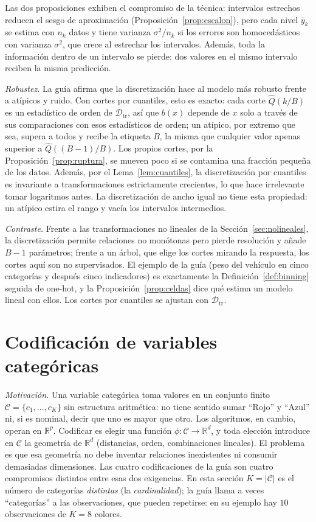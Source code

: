 \documentclass[11pt]{article}
\theoremstyle{definition}
\theoremstyle{remark}
\newcommand{\R}{\mathbb{R}}
\newcommand{\abs}[1]{\left\lvert #1\right\rvert}
\newcommand{\Dtr}{\mathcal{D}_{\mathrm{tr}}}
\begin{document}
\noindent Las dos proposiciones exhiben el compromiso de la técnica: intervalos estrechos reducen el sesgo de aproximación (Proposición~\ref{prop:escalon}), pero cada nivel $\bar y_k$ se estima con $n_k$ datos y tiene varianza $\sigma^2/n_k$ si los errores son homocedásticos con varianza $\sigma^2$, que crece al estrechar los intervalos. Además, toda la información dentro de un intervalo se pierde: dos valores en el mismo intervalo reciben la misma predicción.

\medskip

\noindent \emph{Robustez.} La guía afirma que la discretización hace al modelo más robusto frente a atípicos y ruido. Con cortes por cuantiles, esto es exacto: cada corte $\hat Q(k/B)$ es un estadístico de orden de $\Dtr$, así que $b(x)$ depende de $x$ solo a través de sus comparaciones con esos estadísticos de orden; un atípico, por extremo que sea, supera a todos y recibe la etiqueta $B$, la misma que cualquier valor apenas superior a $\hat Q((B-1)/B)$. Los propios cortes, por la Proposición~\ref{prop:ruptura}, se mueven poco si se contamina una fracción pequeña de los datos. Además, por el Lema~\ref{lem:cuantiles}, la discretización por cuantiles es invariante a transformaciones estrictamente crecientes, lo que hace irrelevante tomar logaritmos antes. La discretización de ancho igual no tiene esta propiedad: un atípico estira el rango y vacía los intervalos intermedios.

\medskip

\noindent \emph{Contraste.} Frente a las transformaciones no lineales de la Sección~\ref{sec:nolineales}, la discretización permite relaciones no monótonas pero pierde resolución y añade $B-1$ parámetros; frente a un árbol, que elige los cortes mirando la respuesta, los cortes aquí son no supervisados. El ejemplo de la guía (peso del vehículo en cinco categorías y después cinco indicadores) es exactamente la Definición~\ref{def:binning} seguida de one-hot, y la Proposición~\ref{prop:celdas} dice qué estima un modelo lineal con ellos. Los cortes por cuantiles se ajustan con $\Dtr$.

\section{Codificación de variables categóricas}\label{sec:categoricas}

\noindent \emph{Motivación.} Una variable categórica toma valores en un conjunto finito $\mathcal{C}=\{c_1,\dots,c_K\}$ sin estructura aritmética: no tiene sentido sumar ``Rojo'' y ``Azul'' ni, si es nominal, decir que uno es mayor que otro. Los algoritmos, en cambio, operan en $\R^p$. Codificar es elegir una función $\phi:\mathcal{C}\to\R^d$, y toda elección introduce en $\mathcal{C}$ la geometría de $\R^d$ (distancias, orden, combinaciones lineales). El problema es que esa geometría no debe inventar relaciones inexistentes ni consumir demasiadas dimensiones. Las cuatro codificaciones de la guía son cuatro compromisos distintos entre esas dos exigencias. En esta sección $K=\abs{\mathcal{C}}$ es el número de categorías \emph{distintas} (la \emph{cardinalidad}); la guía llama a veces ``categorías'' a las observaciones, que pueden repetirse: en su ejemplo hay $10$ observaciones de $K=8$ colores.
\end{document}
